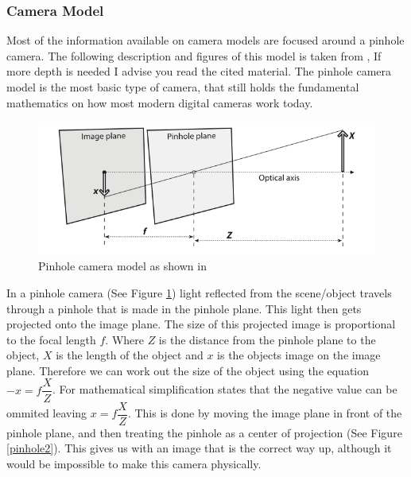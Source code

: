 \documentclass[11pt,oneside]{report}
\begin{document}
				\subsubsection{Camera Model}
				Most of the information available on camera models are focused around a pinhole camera.
				The following description and figures of this model is taken from , If more depth is needed I advise you read the cited material.
				The pinhole camera model is the most basic type of camera, that still holds the fundamental mathematics on how most modern digital cameras work today.
				\begin{figure}[!ht]
				\begin{center}
					\includegraphics[scale=0.5]{pinhole}
					\caption{Pinhole camera model as shown in \protect{} {\label{pinhole}}}
				\end{center}
				\end{figure}
				In a pinhole camera (See Figure \ref{pinhole}) light reflected from the scene/object travels through a pinhole that is made in the pinhole plane.
				This light then gets projected onto the image plane.
				The size of this projected image is proportional to the focal length $f$.
				Where $Z$ is the distance from the pinhole plane to the object, $X$ is the length of the object and $x$ is the objects image on the image plane.
				Therefore we can work out the size of the object using the equation $-x=f\dfrac{X}{Z}$.
				For mathematical simplification  states that the negative value can be ommited leaving $x=f\dfrac{X}{Z}$.
				This is done by moving the image plane in front of the pinhole plane, and then treating the pinhole as a center of projection (See Figure \ref{pinhole2}).
				This gives us with an image that is the correct way up, although it would be impossible to make this camera physically.
\end{document}
